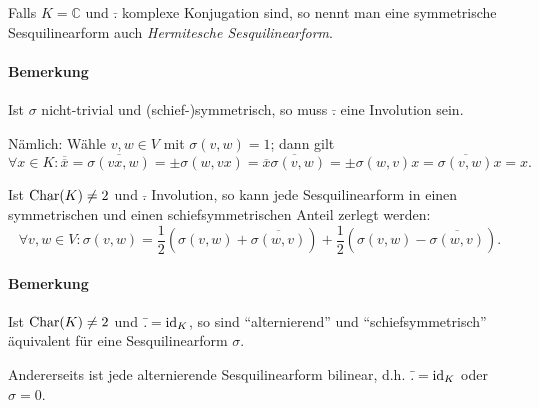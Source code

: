 \begin{Definition}
	Falls $ K =\mathbb{C} $ und $ \bar{.} $ komplexe Konjugation sind, so nennt man eine symmetrische Sesquilinearform auch \emph{Hermitesche Sesquilinearform}.
\end{Definition}

\paragraph{Bemerkung}
	Ist $ \sigma $ nicht-trivial und (schief-)symmetrisch, so muss $ \bar{.} $ eine Involution sein.
	
	Nämlich: Wähle $ v,w\in V $ mit $ \sigma(v,w) = 1$; dann gilt
		\[ \forall x\in K: \overline{\overline{x}} = \overline{\sigma(vx,w)} = \pm \sigma(w,vx) = \overline{\overline{x}\sigma(v,w)} = \pm \sigma(w,v)x = \overline{\sigma(v,w)}x = x. \]

	Ist $ \operatorname{Char}(K) \neq 2 $ und $ \bar{.}  $ Involution, so kann jede Sesquilinearform in einen symmetrischen und einen schiefsymmetrischen Anteil zerlegt werden:
		\[ \forall v,w\in V: \sigma(v,w) = \frac{1}{2}\left(\sigma(v,w)+\overline{\sigma(w,v)}\right) +\frac{1}{2}\left(\sigma(v,w)-\overline{\sigma(w,v)} \right).\]
\paragraph{Bemerkung}
	Ist $ \operatorname{Char}(K)\neq 2 $ und $ \bar{.} = \operatorname{id}_K $, so sind "`alternierend"' und "`schiefsymmetrisch"' äquivalent für eine Sesquilinearform $ \sigma $.
	
	Andererseits ist jede alternierende Sesquilinearform bilinear, d.h. $ \bar{.} = \operatorname{id}_K $ oder $ \sigma = 0 $.
	

